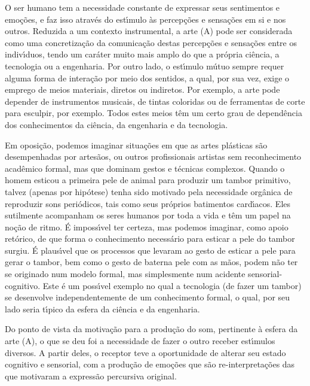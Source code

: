 \documentclass[
12pt,		%
openright,	%
twoside,  %
a4paper,			%
chapter=TITLE,		%
english,			%
french,				%
spanish,			%
brazil				%
]{USPSC-classe/USPSC}
\begin{document}
O ser humano tem a necessidade constante de expressar seus sentimentos e emo\c{c}\~oes, e faz isso atrav\'es do est\'{\i}mulo \`as percep\c{c}\~oes e sensa\c{c}\~oes em si e nos outros. Reduzida a um contexto instrumental, a arte (A) pode ser considerada como uma concretiza\c{c}\~ao da comunica\c{c}\~ao destas percep\c{c}\~oes e sensa\c{c}\~oes entre os indiv\'{\i}duos, tendo um car\'ater muito mais amplo do que a pr\'opria ci\^encia, a tecnologia ou a engenharia. Por outro lado, o est\'{\i}mulo m\'utuo sempre requer alguma forma de intera\c{c}\~ao por meio dos sentidos, a qual, por sua vez, exige o emprego de meios materiais, diretos ou indiretos. Por exemplo, a arte pode depender de instrumentos musicais, de tintas coloridas ou de ferramentas de corte para esculpir, por exemplo. Todos estes meios t\^em um certo grau de depend\^encia dos conhecimentos da ci\^encia, da engenharia e da tecnologia.










Em oposi\c{c}\~ao, podemos imaginar situa\c{c}\~oes em que as artes pl\'asticas s\~ao desempenhadas por artes\~aos, ou outros profissionais artistas sem reconhecimento acad\^emico formal, mas que dominam gestos e t\'ecnicas complexos. Quando o homem esticou a primeira pele de animal para produzir um tambor primitivo, talvez (apenas por hip\'otese) tenha sido motivado pela necessidade org\^anica de reproduzir sons peri\'odicos, tais como seus pr\'oprios batimentos card\'{\i}acos. Eles sutilmente acompanham os seres humanos por toda a vida e t\^em um papel na no\c{c}\~ao de ritmo. \'E imposs\'{\i}vel ter certeza, mas podemos imaginar, como apoio ret\'orico, de que forma o conhecimento necess\'ario para esticar a pele do tambor surgiu. \'E plaus\'{\i}vel que os processos que levaram ao gesto de esticar a pele para gerar o tambor, bem como o gesto de \textquotedbl bater\textquotedbl  na pele com as m\~aos, podem n\~ao ter se originado num modelo formal, mas simplesmente num acidente sensorial-cognitivo. Este \'e um poss\'{\i}vel exemplo no qual a tecnologia (de fazer um tambor) se desenvolve independentemente de um conhecimento formal, o qual, por seu lado seria t\'{\i}pico da esfera da ci\^encia e da engenharia.










Do ponto de vista da motiva\c{c}\~ao para a produ\c{c}\~ao do som, pertinente \`a esfera da arte (A), o que se deu foi a necessidade de fazer o outro receber est\'{\i}mulos diversos. A partir deles, o receptor teve a oportunidade de alterar seu estado cognitivo e sensorial, com a produ\c{c}\~ao de emo\c{c}\~oes que s\~ao re-interpreta\c{c}\~oes das que motivaram a express\~ao percursiva original.
\end{document}
